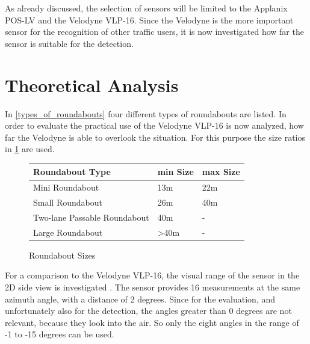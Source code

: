 \documentclass[11pt,oneside,openright]{mpreport}
\begin{document}
As already discussed, the selection of sensors will be limited to the Applanix POS-LV and the Velodyne VLP-16. Since the Velodyne is the more
important sensor for the recognition of other traffic users, it is now investigated how far the sensor is suitable for the detection.

\section{Theoretical Analysis}

In \cref{types_of_roundabouts} four different types of roundabouts are listed. In order to evaluate the practical use of the Velodyne VLP-16 is now analyzed,
how far the Velodyne is able to overlook the situation. For this purpose the size ratios in \cref{roundabout_size} are used.

\begin{figure}[!ht]
\caption{Roundabout Sizes}
  \begin{tabularx}{\textwidth}{X|X|X}
  \hline \textbf{Roundabout Type} & \textbf{min Size} & \textbf{max Size} \\\hline
  Mini Roundabout& 13m & 22m \\\hline
  Small Roundabout& 26m  & 40m \\\hline
  Two-lane Passable Roundabout& 40m & - \\\hline
  Large Roundabout& >40m &  - \\
  \end{tabularx}
\label{roundabout_size}
\end{figure}


For a comparison to the Velodyne VLP-16, the visual range of the sensor in the 2D side view is investigated . The sensor provides 16 measurements at the same azimuth angle,
with a distance of 2 degrees. Since for the evaluation, and unfortunately also for the detection, the angles greater than 0 degrees are not relevant, because they look into
the air. So only the eight angles in the range of -1 to -15 degrees can be used.
\end{document}
